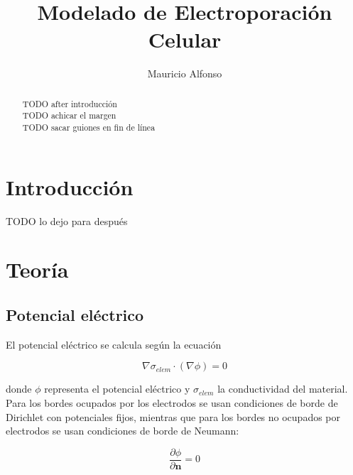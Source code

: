 \documentclass[a4paper,10pt]{article}
\title{Modelado de Electroporación Celular}
\author{Mauricio Alfonso}
\begin{document}
\maketitle

\begin{abstract}

TODO after introducción\\

TODO achicar el margen\\

TODO sacar guiones en fin de línea

\end{abstract}


\section{Introducción}
TODO lo dejo para después

\section{Teoría}

\subsection{Potencial eléctrico}

El potencial eléctrico se calcula según la ecuación 

\begin{equation} \label{eq:poisson}
	\nabla \sigma_{elem} \cdot (\nabla \phi) = 0 
\end{equation}

donde $\phi$ representa el potencial eléctrico y $\sigma_{elem}$ la conductividad del material. \\

Para los bordes ocupados por los electrodos se usan condiciones de borde de Dirichlet con potenciales fijos, mientras que para los bordes no ocupados por electrodos se usan condiciones de borde de Neumann:

\begin{equation}
	\frac{\partial \phi}{\partial \mathbf{n}} = 0
\end{equation}
\end{document}
